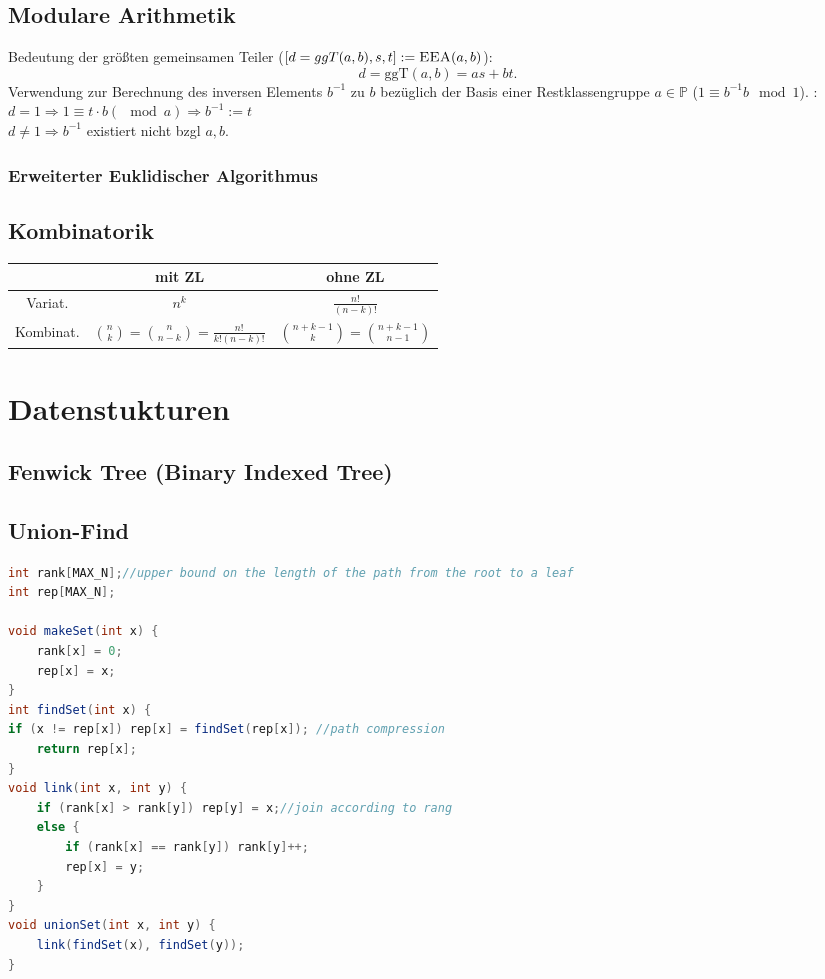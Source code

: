 \documentclass[10pt,a4paper,ngerman,oneside,]{article}
\begin{document}
\begin{multicols}{2}
\subsection{Modulare Arithmetik}
Bedeutung der größten gemeinsamen Teiler ($[d = ggT(a,b),s,t]:=\textsc{EEA}(a,b)$):
\[ d = \text{ggT}(a,b) = as+bt. \]
Verwendung zur Berechnung des inversen Elements $b^{-1}$ zu $b$ bezüglich der Basis einer Restklassengruppe $a\in\mathbb{P}$ ($1\equiv b^{-1}b \mod 1$). :\\
$d=1\Rightarrow 1\equiv t\cdot b (\mod a)\Rightarrow b^{-1}:=t$\\
$d\neq 1 \Rightarrow b^{-1}$ existiert nicht bzgl $a,b$.
\subsubsection{Erweiterter Euklidischer Algorithmus}
\subsection{Kombinatorik}
\begin{tabular}{|c||c|c|}\hline
 & mit ZL & ohne ZL\\\hline\hline
Variat. & $n^k$ & $\frac{n!}{(n-k)!}$\\\hline
Kombinat. & $\binom{n}{k}=\binom{n}{n-k}=\frac{n!}{k!(n-k)!}$ & $\binom{n+k-1}{k}=\binom{n+k-1}{n-1}$\\\hline
\end{tabular}
\section{Datenstukturen}
\subsection{Fenwick Tree (Binary Indexed Tree)}
\subsection{Union-Find}
\begin{lstlisting}[language=Java]
int rank[MAX_N];//upper bound on the length of the path from the root to a leaf
int rep[MAX_N];

void makeSet(int x) {
	rank[x] = 0;
	rep[x] = x;
}
int findSet(int x) {
if (x != rep[x]) rep[x] = findSet(rep[x]); //path compression
	return rep[x];
}
void link(int x, int y) {
	if (rank[x] > rank[y]) rep[y] = x;//join according to rang
	else {
		if (rank[x] == rank[y]) rank[y]++;
		rep[x] = y;
	}
}
void unionSet(int x, int y) {
	link(findSet(x), findSet(y));
}
\end{lstlisting}

\end{multicols}
\end{document}
